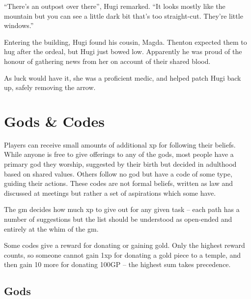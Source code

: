 \documentclass[titlepage,a4paper,openany]{book}
\begin{document}
\begin{multicols}{2}
{{``There's an outpost over there'', Hugi remarked. ``It looks mostly like the mountain but you can see a little dark bit that's too straight-cut. They're little windows.''\newline

Entering the building, Hugi found his cousin, Magda. Thenton expected them to hug after the ordeal, but Hugi just bowed low. Apparently he was proud of the honour of gathering news from her on account of their shared blood.

As luck would have it, she was a proficient medic, and helped patch Hugi back up, safely removing the arrow.

}}{}

\end{multicols}

\chapter[Gods \& Codes]{Gods \& Codes}
\label{gods_codes}

\begin{multicols}{2}

Players can receive small amounts of additional \gls{xp} for following their beliefs. While anyone is free to give offerings to any of the gods, most people have a primary god they worship, suggested by their birth but decided in adulthood based on shared values. Others follow no god but have a code of some type, guiding their actions. These codes are not formal beliefs, written as law and discussed at meetings but rather a set of aspirations which some have.

The \gls{gm} decides how much \gls{xp} to give out for any given task -- each path has a number of suggestions but the list should be understood as open-ended and entirely at the whim of the \gls{gm}.

Some codes give a reward for donating or gaining gold.  Only the highest reward counts, so someone cannot gain 1\gls{xp} for donating a gold piece to a temple, and then gain 10 more for donating 100GP -- the highest sum takes precedence.

\end{multicols}

\section{Gods}
\end{document}
